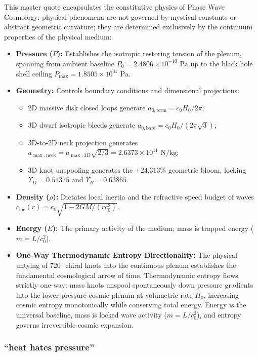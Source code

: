 \documentclass[11pt,a4paper]{article}
\begin{document}
This master quote encapsulates the constitutive physics of Phase Wave Cosmology: physical phenomena are not governed by mystical constants or abstract geometric curvature; they are determined exclusively by the continuum properties of the physical medium:
\begin{itemize}
    \item \textbf{Pressure ($P$):} Establishes the isotropic restoring tension of the plenum, spanning from ambient baseline $P_0 = 2.4806 \times 10^{-10}\text{ Pa}$ up to the black hole shell ceiling $P_{\max} = 1.8505 \times 10^{31}\text{ Pa}$.
    \item \textbf{Geometry:} Controls boundary conditions and dimensional projections:
    \begin{itemize}
        \item 2D massive disk closed loops generate $a_{0,\text{term}} = c_0 H_0 / 2\pi$;
        \item 3D dwarf isotropic bleeds generate $a_{0,\text{bare}} = c_0 H_0 / (2\pi\sqrt{3})$;
        \item 3D-to-2D neck projection generates $a_{\max,\text{neck}} = a_{\max,3D}\sqrt{2/3} = 2.6373 \times 10^{11}\text{ N/kg}$;
        \item 3D knot unspooling generates the $+24.313\%$ geometric bloom, locking $\Upsilon_D = 0.51375$ and $\Upsilon_B = 0.63865$.
    \end{itemize}
    \item \textbf{Density ($\rho$):} Dictates local inertia and the refractive speed budget of waves $c_{\text{loc}}(r) = c_0 \sqrt{1 - 2GM/(r c_0^2)}$.
    \item \textbf{Energy ($E$):} The primary activity of the medium; mass is trapped energy ($m = L/c_0^2$).
    \item \textbf{One-Way Thermodynamic Entropy Directionality:} The physical untying of $720^\circ$ chiral knots into the continuous plenum establishes the fundamental cosmological arrow of time. Thermodynamic entropy flows strictly one-way: mass knots unspool spontaneously down pressure gradients into the lower-pressure cosmic plenum at volumetric rate $H_0$, increasing cosmic entropy monotonically while conserving total energy. Energy is the universal baseline, mass is locked wave activity ($m = L/c_0^2$), and entropy governs irreversible cosmic expansion.
\end{itemize}

\subsubsection{``heat hates pressure''}
\label{subsubsec:quote_heat_hates_pressure}
\end{document}
